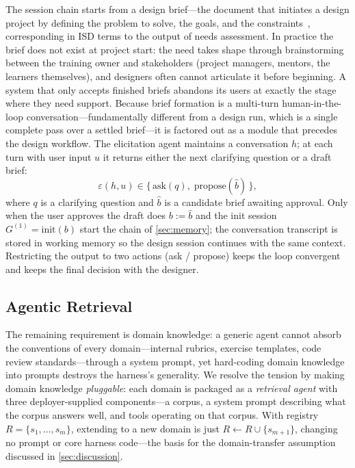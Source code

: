 The session chain starts from a design brief---the document that initiates a design project by defining the problem to solve, the goals, and the constraints~\cite{read2012designbrief}, corresponding in ISD terms to the output of needs assessment. In practice the brief does not exist at project start: the need takes shape through brainstorming between the training owner and stakeholders (project managers, mentors, the learners themselves), and designers often cannot articulate it before beginning. A system that only accepts finished briefs abandons its users at exactly the stage where they need support. Because brief formation is a multi-turn human-in-the-loop conversation---fundamentally different from a design run, which is a single complete pass over a settled brief---it is factored out as a module that precedes the design workflow. The elicitation agent maintains a conversation $h$; at each turn with user input $u$ it returns either the next clarifying question or a draft brief:
\[
\varepsilon(h, u) \in \{\, \mathrm{ask}(q), \; \mathrm{propose}(\hat{b}) \,\},
\]
where $q$ is a clarifying question and $\hat{b}$ is a candidate brief awaiting approval. Only when the user approves the draft does $b := \hat{b}$ and the init session $G^{(1)} = \mathrm{init}(b)$ start the chain of \cref{sec:memory}; the conversation transcript is stored in working memory so the design session continues with the same context. Restricting the output to two actions (ask / propose) keeps the loop convergent and keeps the final decision with the designer.

\subsection{Agentic Retrieval}
\label{sec:agentic-rag}

The remaining requirement is domain knowledge: a generic agent cannot absorb the conventions of every domain---internal rubrics, exercise templates, code review standards---through a system prompt, yet hard-coding domain knowledge into prompts destroys the harness's generality. We resolve the tension by making domain knowledge \emph{pluggable}: each domain is packaged as a \emph{retrieval agent} with three deployer-supplied components---a corpus, a system prompt describing what the corpus answers well, and tools operating on that corpus. With registry $R = \{s_1, \dots, s_m\}$, extending to a new domain is just $R \leftarrow R \cup \{s_{m+1}\}$, changing no prompt or core harness code---the basis for the domain-transfer assumption discussed in \cref{sec:discussion}.

